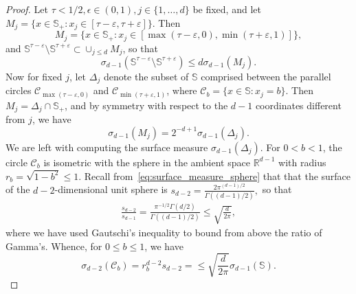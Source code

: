 \documentclass{article}
\numberwithin{equation}{section}
\newcommand{\rset}{\mathbb{R}}
\newcommand{\sphere}{\mathbb{S}}
\begin{document}
    \begin{proof}
      Let $\tau<1/2,\epsilon\in(0,1), j\in\{1,\ldots, d\}$ be fixed, and let 
      $M_j = \{x \in \sphere_+: x_j\in
      [\tau-\varepsilon ,\tau+\varepsilon ]\}$. Then
      $$
      M_j = \{x \in \sphere_+: x_j\in
      [\max(\tau-\varepsilon,0) ,\min(\tau+\varepsilon,1) ]\}, 
      $$
      and 
      $\sphere^{\tau-\varepsilon }\setminus\sphere^{\tau+\varepsilon }\subset
      \cup_{j\le d} M_j$,  so that
      \begin{equation}
          \label{eq:bound_union_slices1}
          \sigma_{d-1}(\sphere^{\tau-\varepsilon }\setminus\sphere^{\tau+\varepsilon })
      \le d\sigma_{d-1}(M_j).
      \end{equation} 
      Now for fixed $j$, %
      let $\Delta_j$ denote the subset of $\sphere$ comprised between the parallel circles
      $\mathcal{C}_{\max(\tau-\varepsilon,0) }$ and $\mathcal{C}_{\min(\tau+\varepsilon, 1) }$, where $\mathcal{C}_b = \{x\in\sphere: x_j = b\}$. Then $M_j = \Delta_j\cap\sphere_+$, and by symmetry with respect to the $d-1$ coordinates different from $j$, we have 
      \begin{equation}
          \label{eq:bound_union_slices_2}
          \sigma_{d-1}(M_j) = 2^{-d+1}\sigma_{d-1}(\Delta_j).
      \end{equation} 
      We are left with computing the surface measure $\sigma_{d-1}(\Delta_j)$. 
      For $0<b<1$, the circle $\mathcal{C}_b$ is isometric with the sphere in the ambient space $\rset^{d-1}$ with radius $r_b = \sqrt{1-b^2}\le 1$. %
Recall from~\eqref{eq:surface_measure_sphere} that       that the surface of the $d-2$-dimensional unit sphere is 
       $s_{d-2} = \frac{2 \pi^{(d-1)/2}}{\Gamma((d-1)/2)},  $
so that %
      \begin{align*}
        \frac{s_{d-2}}{s_{d-1}}  = \frac{\pi^{-1/2} \Gamma(d/2)}{\Gamma((d-1)/2)}
        \le \sqrt{\frac{d}{2\pi}}, 
      \end{align*}
      where we have used Gautschi's inequality to bound from above the ratio of Gamma's. 
      Whence, for $0\le b\le 1$, we have
$$
\sigma_{d-2}(\mathcal{C}_b) = r_b^{d-2} s_{d-2} = 
\le \sqrt{\frac{d}{2\pi}} \sigma_{d-1}(\sphere).%
$$
     

\end{proof}
\end{document}
